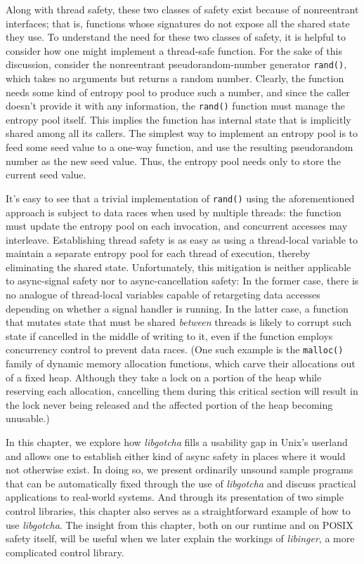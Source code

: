 Along with thread safety, these two classes of safety exist because of nonreentrant
interfaces; that is, functions whose signatures do not expose all the shared state
they use.  To understand the need for these two classes of safety, it is helpful to
consider how one might implement a thread-safe function.  For the sake of this
discussion, consider the nonreentrant pseudorandom-number generator \texttt{rand()},
which takes no arguments but returns a random number.  Clearly, the function needs
some kind of entropy pool to produce such a number, and since the caller doesn't
provide it with any information, the \texttt{rand()} function must manage the entropy
pool itself.  This implies the function has internal state that is implicitly shared
among all its callers.  The simplest way to implement an entropy pool is to feed some
seed value to a one-way function, and use the resulting pseudorandom number as the
new seed value.  Thus, the entropy pool needs only to store the current seed value.

It's easy to see that a trivial implementation of \texttt{rand()} using the
aforementioned approach is subject to data races when used by multiple threads:\@
the function must update the entropy pool on each invocation, and concurrent accesses
may interleave.  Establishing thread safety is as easy as using a thread-local
variable to maintain a separate entropy pool for each thread of execution, thereby
eliminating the shared state.  Unfortunately, this mitigation is neither applicable
to async-signal safety nor to async-cancellation safety:  In the former case, there
is no analogue of thread-local variables capable of retargeting data accesses
depending on whether a signal handler is running.  In the latter case, a function
that mutates state that must be shared \textit{between} threads is likely to corrupt
such state if cancelled in the middle of writing to it, even if the function employs
concurrency control to prevent data races.  (One such example is the
\texttt{malloc()} family of dynamic memory allocation functions, which carve their
allocations out of a fixed heap.  Although they take a lock on a portion of the heap
while reserving each allocation, cancelling them during this critical section will
result in the lock never being released and the affected portion of the heap becoming
unusable.)

In this chapter, we explore how \textit{libgotcha} fills a usability gap in Unix's
userland and allows one to establish either kind of async safety in places where it
would not otherwise exist.  In doing so, we present ordinarily unsound sample
programs that can be automatically fixed through the use of \textit{libgotcha} and
discuss practical applications to real-world systems.  And through its presentation
of two simple control libraries, this chapter also serves as a straightforward
example of how to use \textit{libgotcha}.  The insight from this chapter, both on our
runtime and on POSIX safety itself, will be useful when we later explain the workings
of \textit{libinger}, a more complicated control library.


